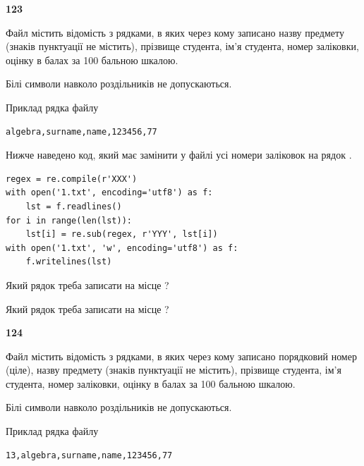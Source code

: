 \newpage

{\begin {center}\textbf{ 123}\end {center}}\par
Файл  містить відомість з рядками, в яких через кому записа\-но назву предмету (знаків пунктуації не містить), прізвище студента, ім'я студента, номер залі\-ков\-ки, оцінку в балах за 100 бальною шкалою.

Білі символи навколо роздільників не допускаються.

Приклад рядка файлу



\begin{verbatim}
algebra,surname,name,123456,77
\end{verbatim}


Нижче наведено код, який має замінити у файлі усі номери заліковок на рядок \code{***}.



\begin{verbatim}
regex = re.compile(r'XXX')
with open('1.txt', encoding='utf8') as f:
    lst = f.readlines()
for i in range(len(lst)):
    lst[i] = re.sub(regex, r'YYY', lst[i])
with open('1.txt', 'w', encoding='utf8') as f:
    f.writelines(lst)
\end{verbatim}







Який рядок треба записати на місце  ?\par
\vspace{5mm}


Який рядок треба записати на місце  ?\par


\newpage

{\begin {center}\textbf{ 124}\end {center}}\par
Файл  містить відомість з рядками, в яких через кому записано поряд\-ковий номер (ціле), назву предмету (знаків пунктуації не містить), прізвище студента, ім'я студента, номер заліковки, оцінку в балах за 100 бальною шкалою.

Білі символи навколо роздільників не допускаються.

Приклад рядка файлу



\begin{verbatim}
13,algebra,surname,name,123456,77
\end{verbatim}


